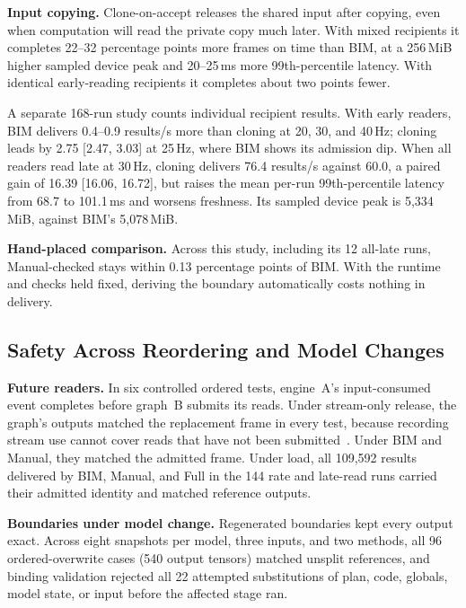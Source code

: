 \documentclass[conference]{IEEEtran}
\newcommand{\MiB}{\,MiB}
\newcommand{\ms}{\,ms}
\newcommand{\Hz}{\,Hz}
\begin{document}
\textbf{Input copying.} Clone-on-accept releases the shared input after copying, even when computation will read the private copy much later. With mixed recipients it completes 22--32 percentage points more frames on time than BIM, at a 256\MiB{} higher sampled device peak and 20--25\ms{} more 99th-percentile latency. With identical early-reading recipients it completes about two points fewer.

A separate 168-run study counts individual recipient results. With early readers, BIM delivers 0.4--0.9 results/s more than cloning at 20, 30, and 40\Hz; cloning leads by 2.75 [2.47, 3.03] at 25\Hz, where BIM shows its admission dip. When all readers read late at 30\Hz, cloning delivers 76.4 results/s against 60.0, a paired gain of 16.39 [16.06, 16.72], but raises the mean per-run 99th-percentile latency from 68.7 to 101.1\ms{} and worsens freshness. Its sampled device peak is 5,334\MiB, against BIM's 5,078\MiB.

\textbf{Hand-placed comparison.} Across this study, including its 12 all-late runs, Manual-checked stays within 0.13 percentage points of BIM. With the runtime and checks held fixed, deriving the boundary automatically costs nothing in delivery.

\subsection{Safety Across Reordering and Model Changes}
\label{sec:eval-safety}

\textbf{Future readers.} In six controlled ordered tests, engine~A's input-consumed event completes before graph~B submits its reads. Under stream-only release, the graph's outputs matched the replacement frame in every test, because recording stream use cannot cover reads that have not been submitted~\cite{recordstream}. Under BIM and Manual, they matched the admitted frame. Under load, all 109,592 results delivered by BIM, Manual, and Full in the 144 rate and late-read runs carried their admitted identity and matched reference outputs.

\textbf{Boundaries under model change.} Regenerated boundaries kept every output exact. Across eight snapshots per model, three inputs, and two methods, all 96 ordered-overwrite cases (540 output tensors) matched unsplit references, and binding validation rejected all 22 attempted substitutions of plan, code, globals, model state, or input before the affected stage ran.
\end{document}
